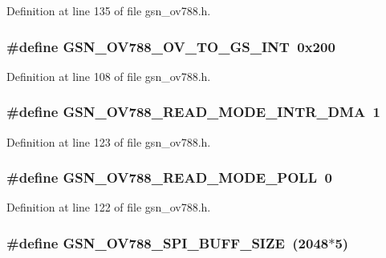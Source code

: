Definition at line 135 of file gsn\_\-ov788.h.

\hypertarget{a00537_af9417255b91078af42a150e6127bd7ba}{
\subsubsection[{GSN\_\-OV788\_\-OV\_\-TO\_\-GS\_\-INT}]{\setlength{\rightskip}{0pt plus 5cm}\#define GSN\_\-OV788\_\-OV\_\-TO\_\-GS\_\-INT~0x200}}
\label{a00537_af9417255b91078af42a150e6127bd7ba}


Definition at line 108 of file gsn\_\-ov788.h.

\hypertarget{a00537_aed3b15baaeb2570db93ae67dad6ea899}{
\subsubsection[{GSN\_\-OV788\_\-READ\_\-MODE\_\-INTR\_\-DMA}]{\setlength{\rightskip}{0pt plus 5cm}\#define GSN\_\-OV788\_\-READ\_\-MODE\_\-INTR\_\-DMA~1}}
\label{a00537_aed3b15baaeb2570db93ae67dad6ea899}


Definition at line 123 of file gsn\_\-ov788.h.

\hypertarget{a00537_a09855a349dab58d6e38434e1cdb56cfb}{
\subsubsection[{GSN\_\-OV788\_\-READ\_\-MODE\_\-POLL}]{\setlength{\rightskip}{0pt plus 5cm}\#define GSN\_\-OV788\_\-READ\_\-MODE\_\-POLL~0}}
\label{a00537_a09855a349dab58d6e38434e1cdb56cfb}


Definition at line 122 of file gsn\_\-ov788.h.

\hypertarget{a00537_a572ce14a1306ec5a06c6e323e727d392}{
\subsubsection[{GSN\_\-OV788\_\-SPI\_\-BUFF\_\-SIZE}]{\setlength{\rightskip}{0pt plus 5cm}\#define GSN\_\-OV788\_\-SPI\_\-BUFF\_\-SIZE~(2048$\ast$5)}}
\label{a00537_a572ce14a1306ec5a06c6e323e727d392}


